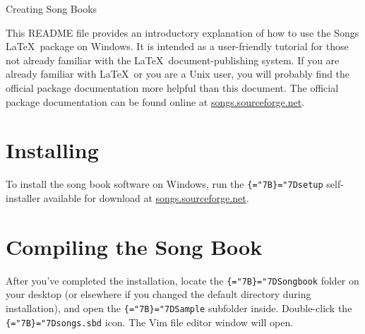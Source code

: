 \documentclass[12pt,oneside,letterpaper]{article}
\newcommand{\mytt}{\tt\chardef\{="7B\chardef\}="7D\relax}
\newcommand{\ppath}[1]{{\mytt#1}}
\begin{document}
\vspace*{1cm}\hfil{\Huge Creating Song Books}\par\vspace{1cm}

This README file provides an introductory explanation of how to use the Songs
\LaTeX\ package on Windows.
It is intended as a user-friendly tutorial for those not already familiar
with the \LaTeX\ document-publishing system.
If you are already familiar with \LaTeX\ or you are a Unix user, you will
probably find the official package documentation more helpful than this
document.
The official package documentation can be found online at
\href{http://songs.sourceforge.net}{songs.sourceforge.net}.

\section{Installing}\label{sec:installing}

To install the song book software on Windows, run the \ppath{setup}
self-installer available for download at
\href{http://songs.sourceforge.net}{songs.sourceforge.net}.

\section{Compiling the Song Book}\label{sec:compiling}

After you've completed the installation, locate the \ppath{Songbook} folder
on your desktop (or elsewhere if you changed the default directory during
installation), and open the \ppath{Sample} subfolder inside.
Double-click the \ppath{songs.sbd} icon.
The Vim file editor window will open.

\vspace{-8pt}%
\hfil{}\par\vspace{2pt}
\end{document}
